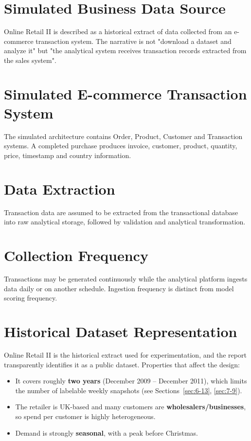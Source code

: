 \section{Simulated Business Data Source}
\label{sec:5-1}

Online Retail II is described as a historical extract of data collected from an e-commerce transaction system. The narrative is not "download a dataset and analyze it" but "the analytical system receives transaction records extracted from the sales system".

\section{Simulated E-commerce Transaction System}
\label{sec:5-2}

The simulated architecture contains Order, Product, Customer and Transaction systems. A completed purchase produces invoice, customer, product, quantity, price, timestamp and country information.

\section{Data Extraction}
\label{sec:5-3}

Transaction data are assumed to be extracted from the transactional database into raw analytical storage, followed by validation and analytical transformation.

\section{Collection Frequency}
\label{sec:5-4}

Transactions may be generated continuously while the analytical platform ingests data daily or on another schedule. Ingestion frequency is distinct from model scoring frequency.

\section{Historical Dataset Representation}
\label{sec:5-5}

Online Retail II is the historical extract used for experimentation, and the report transparently identifies it as a public dataset. Properties that affect the design:

\begin{itemize}
    \item It covers roughly \textbf{two years} (December 2009 -- December 2011), which limits the number of labelable weekly snapshots (see Sections~\ref{sec:6-13}, \ref{sec:7-9}).
    \item The retailer is UK-based and many customers are \textbf{wholesalers/businesses}, so spend per customer is highly heterogeneous.
    \item Demand is strongly \textbf{seasonal}, with a peak before Christmas.
\end{itemize}
